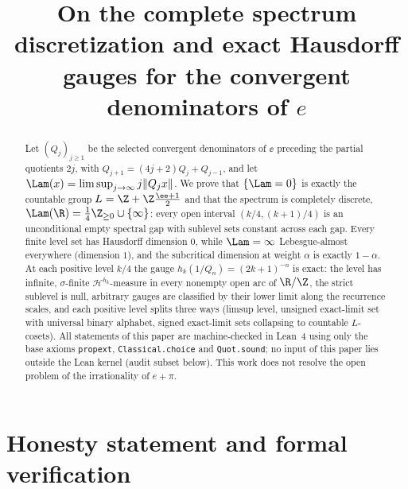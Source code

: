 \title{On the complete spectrum discretization and exact Hausdorff gauges
for the convergent denominators of $e$}


\maketitle

\begin{abstract}
Let $(Q_j)_{j\ge1}$ be the selected convergent denominators of $\ee$ preceding
the partial quotients $2j$, with $Q_{j+1}=(4j+2)Q_j+Q_{j-1}$, and let
$\Lam(x)=\limsup_{j\to\infty}j\|Q_jx\|$. We prove that $\{\Lam=0\}$ is exactly
the countable group $L=\Z+\Z\frac{\ee+1}{2}$ and that the spectrum is
completely discrete, $\Lam(\R)=\frac14\Z_{\ge0}\cup\{\infty\}$: every open
interval $(k/4,(k+1)/4)$ is an unconditional empty spectral gap with sublevel
sets constant across each gap. Every finite level set has Hausdorff dimension
$0$, while $\Lam=\infty$ Lebesgue-almost everywhere (dimension $1$), and the
subcritical dimension at weight $\alpha$ is exactly $1-\alpha$. At each
positive level $k/4$ the gauge $h_k(1/Q_n)=(2k+1)^{-n}$ is exact: the level
has infinite, $\sigma$-finite $\mathcal H^{h_k}$-measure in every nonempty
open arc of $\R/\Z$, the strict sublevel is null, arbitrary gauges are
classified by their lower limit along the recurrence scales, and each positive
level splits three ways (limsup level, unsigned exact-limit set with universal
binary alphabet, signed exact-limit sets collapsing to countable $L$-cosets).
All statements of this paper are machine-checked in Lean~4 using only the base
axioms \texttt{propext}, \texttt{Classical.choice} and \texttt{Quot.sound}; no
input of this paper lies outside the Lean kernel (audit subset below).
This work does not resolve the open problem of the irrationality of $e+\pi$.
\end{abstract}

\section*{Honesty statement and formal verification}

